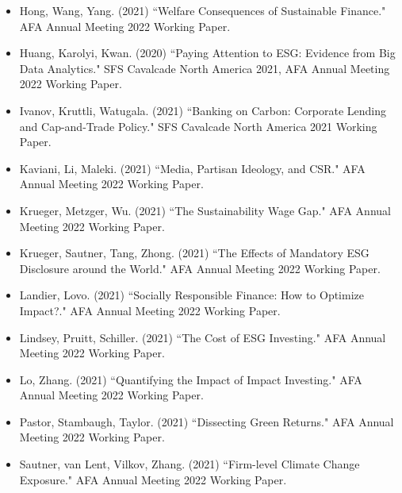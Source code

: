 \documentclass{article}
\begin{document}
\begin{itemize}
\item Hong, Wang, Yang. (2021) ``Welfare Consequences of Sustainable Finance." AFA Annual Meeting 2022 Working Paper.
\item Huang, Karolyi, Kwan. (2020) ``Paying Attention to ESG: Evidence from Big Data Analytics." SFS Cavalcade North America 2021, AFA Annual Meeting 2022 Working Paper.
\item Ivanov, Kruttli, Watugala. (2021) ``Banking on Carbon: Corporate Lending and Cap-and-Trade Policy." SFS Cavalcade North America 2021 Working Paper.
\item Kaviani, Li, Maleki. (2021) ``Media, Partisan Ideology, and CSR." AFA Annual Meeting 2022 Working Paper.
\item Krueger, Metzger, Wu. (2021) ``The Sustainability Wage Gap." AFA Annual Meeting 2022 Working Paper.
\item Krueger, Sautner, Tang, Zhong. (2021) ``The Effects of Mandatory ESG Disclosure around the World." AFA Annual Meeting 2022 Working Paper.
\item Landier, Lovo. (2021) ``Socially Responsible Finance: How to Optimize Impact?." AFA Annual Meeting 2022 Working Paper.
\item Lindsey, Pruitt, Schiller. (2021) ``The Cost of ESG Investing." AFA Annual Meeting 2022 Working Paper.
\item Lo, Zhang. (2021) ``Quantifying the Impact of Impact Investing." AFA Annual Meeting 2022 Working Paper.
\item Pastor, Stambaugh, Taylor. (2021) ``Dissecting Green Returns." AFA Annual Meeting 2022 Working Paper.
\item Sautner, van Lent, Vilkov, Zhang. (2021) ``Firm-level Climate Change Exposure." AFA Annual Meeting 2022 Working Paper.
\end{itemize}
\end{document}
